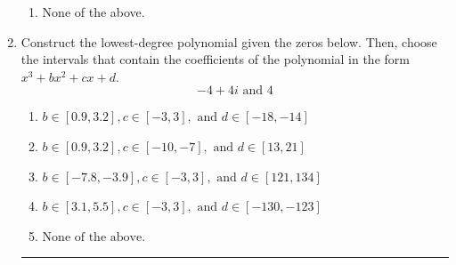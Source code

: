 \documentclass[14pt]{extbook}
\newcommand{\litem}[1]{\item#1\hspace*{-1cm}\rule{\textwidth}{0.4pt}}
\begin{document}
\begin{enumerate}
{\begin{enumerate}[label=\Alph*.]
\item None of the above.
\end{enumerate} }
\litem{
Construct the lowest-degree polynomial given the zeros below. Then, choose the intervals that contain the coefficients of the polynomial in the form $x^3+bx^2+cx+d$.\[ -4 + 4 i \text{ and } 4 \]\begin{enumerate}[label=\Alph*.]
\item \( b \in [0.9, 3.2], c \in [-3, 3], \text{ and } d \in [-18, -14] \)
\item \( b \in [0.9, 3.2], c \in [-10, -7], \text{ and } d \in [13, 21] \)
\item \( b \in [-7.8, -3.9], c \in [-3, 3], \text{ and } d \in [121, 134] \)
\item \( b \in [3.1, 5.5], c \in [-3, 3], \text{ and } d \in [-130, -123] \)
\item \( \text{None of the above.} \)


\end{enumerate}}
\end{enumerate}
\end{document}
